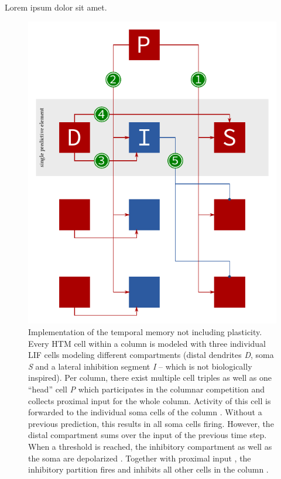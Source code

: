 Lorem ipsum dolor sit amet.

\begin{figure}
	\begin{center}
		\includegraphics{../circuitry/column.pdf}
	\end{center}
	\caption{Implementation of the temporal memory not including plasticity. Every HTM cell within a column is modeled with three individual LIF cells modeling different compartments (distal dendrites \emph{D}, soma \emph{S} and a lateral inhibition segment \emph{I} -- which is not biologically inspired). Per column, there exist multiple cell triples as well as one ``head'' cell \emph{P} which participates in the columnar competition and collects proximal input for the whole column. Activity of this cell is forwarded to the individual soma cells of the column \protect{}. Without a previous prediction, this results in all soma cells firing. However, the distal compartment sums over the input of the previous time step. When a threshold is reached, the inhibitory compartment as well as the soma are depolarized \protect{} \protect{}. Together with proximal input \protect{}, the inhibitory partition fires and inhibits all other cells in the column \protect{}.}
	\label{fig:static_temporal_memory}
\end{figure}


